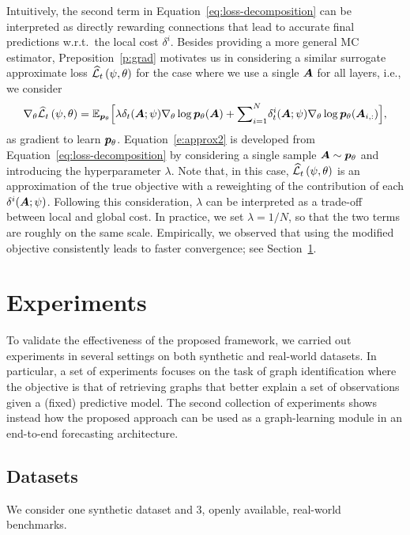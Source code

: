 Intuitively, the second term in Equation~\eqref{eq:loss-decomposition} can be interpreted as directly rewarding connections that lead to accurate final predictions w.r.t.\ the local cost $\delta^i$. Besides providing a more general MC estimator, Preposition~\ref{p:grad} motivates us in considering a similar surrogate approximate loss $\widehat{\mathcal{L}}_t\left(\psi,\theta\right)$ for the case where we use a single ${\bm{A}}$ for all layers, i.e.,  we consider
\begin{equation}\label{e:approx2}
    \nabla_\theta \widehat{\mathcal{L}}_t\left(\psi,\theta\right) = \mathbb{E}_{{{\bm{p}}_\theta}}\Big[ \lambda{\delta}_t({\bm{A}}; \psi)\nabla_\theta \log{{\bm{p}}_\theta}({\bm{A}}) + \small{\sum}_{i=1}^N{\delta}^i_t({\bm{A}}; \psi)\nabla_\theta \log{{\bm{p}}_\theta}({\bm{A}}_{i,:})\Big],
\end{equation}
as gradient to learn ${{\bm{p}}_\theta}$.
Equation~\eqref{e:approx2} is developed from Equation~\eqref{eq:loss-decomposition} by considering a single sample ${\bm{A}}\sim {{\bm{p}}_\theta}$ and introducing the hyperparameter $\lambda$.  Note that, in this case, $\widehat{\mathcal{L}}_t\left(\psi,\theta\right)$ is an approximation of the true objective with a reweighting of the contribution of each $\delta^i({\bm{A}}; \psi)$. Following this consideration, $\lambda$ can be interpreted as a trade-off between local and global cost. In practice, we set $\lambda = 1/N$, so that the two terms are roughly on the same scale. Empirically, we observed that using the modified objective consistently leads to faster convergence; see Section~\ref{sec:exp}.

\section{Experiments}\label{sec:exp}

To validate the effectiveness of the proposed framework, we carried out experiments in several settings on both synthetic and real-world datasets. In particular, a set of experiments focuses on the task of graph identification where the objective is that of retrieving graphs that better explain a set of observations given a (fixed) predictive model. The second collection of experiments shows instead how the proposed approach can be used as a graph-learning module in an end-to-end forecasting architecture. 

\subsection{Datasets}



We consider one synthetic dataset and $3$, openly available, real-world benchmarks. 


